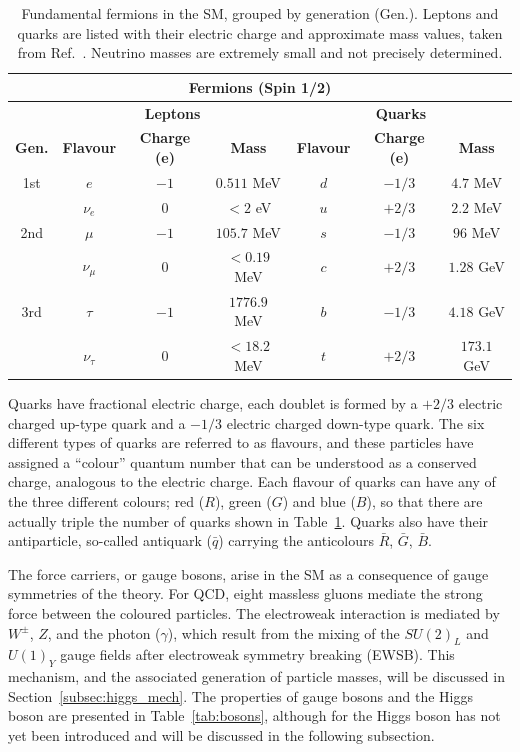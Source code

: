 \begin{table}[htbp]
    \centering
    \caption{Fundamental fermions in the SM, grouped by generation (Gen.). Leptons and quarks are listed with their electric charge and approximate mass values, taken from Ref.~\cite{PhysRevD.98.030001}. Neutrino masses are extremely small and not precisely determined.}
    \small %
    \renewcommand{\arraystretch}{1.2} %
    \setlength{\tabcolsep}{6pt} %
    \begin{tabular}{cccc|ccc}
    \multicolumn{7}{c}{\textbf{Fermions (Spin 1/2)}} \\
    \toprule
     & \multicolumn{3}{c|}{\textbf{Leptons}} & \multicolumn{3}{c}{\textbf{Quarks}} \\
    \midrule
    \textbf{Gen.} & \textbf{Flavour} & \textbf{Charge (e)} & \textbf{Mass} & 
                   \textbf{Flavour} & \textbf{Charge (e)} & \textbf{Mass} \\
    \midrule
    1st & $e$ & $-1$ & $0.511$ MeV & $d$ & $-1/3$ & $4.7$ MeV \\
        & $\nu_e$ & $0$ & $<2$ eV & $u$ & $+2/3$ & $2.2$ MeV \\
    2nd & $\mu$ & $-1$ & $105.7$ MeV & $s$ & $-1/3$ & $96$ MeV \\
        & $\nu_\mu$ & $0$ & $<0.19$ MeV & $c$ & $+2/3$ & $1.28$ GeV \\
    3rd & $\tau$ & $-1$ & $1776.9$ MeV & $b$ & $-1/3$ & $4.18$ GeV \\
        & $\nu_\tau$ & $0$ & $<18.2$ MeV & $t$ & $+2/3$ & $173.1$ GeV \\
    \bottomrule
    \end{tabular}
    \label{tab:fermions}
\end{table}


Quarks have fractional electric charge, each doublet is formed by a $+2/3$ electric charged up-type quark and a $-1/3$ electric charged down-type quark. The six different types of quarks are referred to as flavours, and these particles have assigned a ``colour'' quantum number that can be understood as a conserved charge, analogous to the electric charge. Each flavour of quarks can have any of the three different colours;
red ($R$), green ($G$) and blue ($B$), so that there are actually triple the number of quarks
shown in Table~\ref{tab:fermions}. Quarks also have their antiparticle, so-called antiquark ($\bar{q}$) carrying
the anticolours $\bar{R}$, $\bar{G}$, $\bar{B}$.

The force carriers, or gauge bosons, arise in the SM as a consequence of gauge symmetries of the theory. For QCD, eight massless gluons mediate the strong force between the coloured particles. The electroweak interaction is mediated by $W^\pm$, $Z$, and the photon ($\gamma$), which result from the mixing of the $SU(2)_L$ and $U(1)_Y$ gauge fields after electroweak symmetry breaking (EWSB). This mechanism, and the associated generation of particle masses, will be discussed in Section~\ref{subsec:higgs_mech}. The properties of gauge bosons and the Higgs boson are presented in Table~\ref{tab:bosons}, although for the Higgs boson has not yet been introduced and will be discussed in the following subsection.

